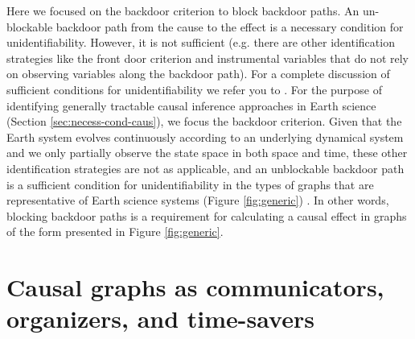 \documentclass[12pt]{article}
\begin{document}
Here we focused on the backdoor criterion to block backdoor paths. An
un-blockable backdoor path from the cause to the effect is a necessary
condition for unidentifiability. However, it is not sufficient
(e.g. there are other identification strategies like the front door
criterion and instrumental variables that do not rely on observing
variables along the backdoor path). For a complete discussion of
sufficient conditions for unidentifiability we refer you to
\citet{shpitser2006}. For the purpose of identifying generally
tractable causal inference approaches in Earth science (Section
\ref{sec:necess-cond-caus}), we focus the backdoor criterion. Given
that the Earth system evolves continuously according to an underlying
dynamical system and we only partially observe the state space in both
space and time, these other identification strategies are not as
applicable, and an unblockable backdoor path is a sufficient condition
for unidentifiability in the types of graphs that are representative
of Earth science systems (Figure \ref{fig:generic})
\citep{tian2002general}. In other words, blocking backdoor paths is a
requirement for calculating a causal effect in graphs of the form
presented in Figure \ref{fig:generic}.

\section{Causal graphs as communicators, organizers, and time-savers}\label{sec:causal-graphs-as}
\end{document}
